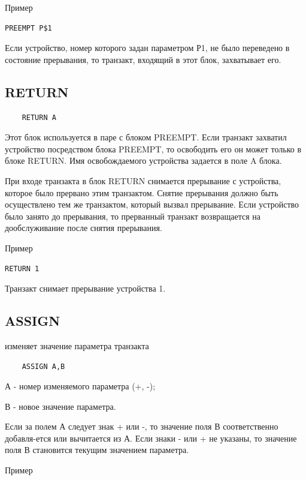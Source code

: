 \documentclass[14pt]{extarticle}
\begin{document}
Пример

\begin{lstlisting}
PREEMPT Р$1
\end{lstlisting}

Если устройство, номер которого задан параметром Р1, не было переведено в состояние прерывания, то транзакт, входящий в этот блок, захватывает его.

\subsection*{RETURN}

\begin{lstlisting}
	RETURN A
\end{lstlisting}

Этот блок используется в паре с блоком PREEMPT. Если транзакт захватил устройство посредством блока PREEMPT, то освободить его он может только в блоке RETURN. Имя освобождаемого устройства задается в поле A блока.

При входе транзакта в блок RETURN снимается прерывание с устройства, которое было прервано этим транзактом. Снятие прерывания должно быть осуществлено тем же транзактом, который вызвал прерывание. Если устройство было занято до прерывания, то прерванный транзакт возвращается на дообслуживание после снятия прерывания.

Пример

\begin{lstlisting}
RETURN 1
\end{lstlisting}

Транзакт снимает прерывание устройства 1.

\subsection*{ASSIGN}

изменяет значение параметра транзакта

\begin{lstlisting}
	ASSIGN A,B
\end{lstlisting}

А - номер изменяемого параметра (+, -);

В - новое значение параметра.

Если за полем А следует знак + или -, то значение поля В соответственно добавля-ется или вычитается из А. Если знаки - или + не указаны, то значение поля В становится текущим значением параметра.


Пример
\end{document}
